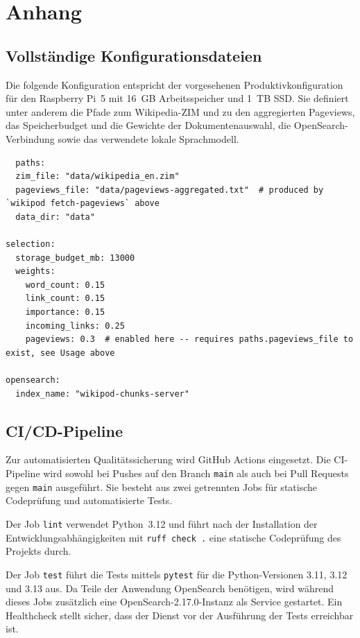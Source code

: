 \chapter{Anhang}
\label{ch:anhang}

\section{Vollständige Konfigurationsdateien}

Die folgende Konfiguration entspricht der vorgesehenen
Produktivkonfiguration für den Raspberry Pi~5 mit 16~GB Arbeitsspeicher
und 1~TB SSD. Sie definiert unter anderem die Pfade zum Wikipedia-ZIM und
zu den aggregierten Pageviews, das Speicherbudget und die Gewichte der
Dokumentenauswahl, die OpenSearch-Verbindung sowie das verwendete lokale
Sprachmodell.

\begin{lstlisting}
  paths:
  zim_file: "data/wikipedia_en.zim"
  pageviews_file: "data/pageviews-aggregated.txt"  # produced by `wikipod fetch-pageviews` above
  data_dir: "data"

selection:
  storage_budget_mb: 13000
  weights:
    word_count: 0.15
    link_count: 0.15
    importance: 0.15
    incoming_links: 0.25
    pageviews: 0.3  # enabled here -- requires paths.pageviews_file to exist, see Usage above

opensearch:
  index_name: "wikipod-chunks-server"
\end{lstlisting}

\section{CI/CD-Pipeline}

Zur automatisierten Qualitätssicherung wird GitHub Actions eingesetzt. Die
CI-Pipeline wird sowohl bei Pushes auf den Branch \texttt{main} als auch bei
Pull Requests gegen \texttt{main} ausgeführt. Sie besteht aus zwei getrennten
Jobs für statische Codeprüfung und automatisierte Tests.

Der Job \texttt{lint} verwendet Python~3.12 und führt nach der Installation
der Entwicklungsabhängigkeiten mit \texttt{ruff check .} eine statische
Codeprüfung des Projekts durch.

Der Job \texttt{test} führt die Tests mittels \texttt{pytest} für die
Python-Versionen 3.11, 3.12 und 3.13 aus. Da Teile der Anwendung OpenSearch
benötigen, wird während dieses Jobs zusätzlich eine
OpenSearch-2.17.0-Instanz als Service gestartet. Ein Healthcheck stellt sicher,
dass der Dienst vor der Ausführung der Tests erreichbar ist.


